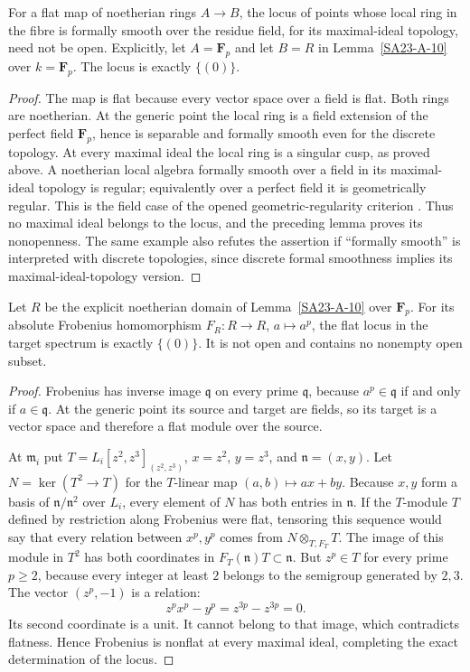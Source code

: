 \begin{theorem}\label{SA23-A-11}
For a flat map of noetherian rings $A\to B$, the locus of points
whose local ring in the fibre is formally smooth over the residue
field, for its maximal-ideal topology, need not be open.
Explicitly, let $A=\mathbf F_p$ and let $B=R$ in
Lemma~\ref{SA23-A-10} over $k=\mathbf F_p$.  The locus is exactly
$\{(0)\}$.
\end{theorem}
\begin{proof}
The map is flat because every vector space over a field is flat.
Both rings are noetherian.  At the generic point the local ring
is a field extension of the perfect field $\mathbf F_p$, hence
is separable and formally smooth even for the discrete topology.
At every maximal ideal the local ring is a singular cusp, as
proved above.  A noetherian local algebra formally smooth over a
field in its maximal-ideal topology is regular; equivalently over
a perfect field it is geometrically regular.  This is the
field case of the opened geometric-regularity criterion
\cite[Tag 07NQ, Proposition 15.41.5]{rootStacksRegular}.
Thus no maximal ideal belongs to the locus, and the preceding
lemma proves its nonopenness.  The same example also refutes the
assertion if ``formally smooth'' is interpreted with discrete
topologies, since discrete formal smoothness implies its
maximal-ideal-topology version.
\end{proof}

\begin{theorem}\label{SA23-A-12}
Let $R$ be the explicit noetherian domain of
Lemma~\ref{SA23-A-10} over $\mathbf F_p$.  For its absolute
Frobenius homomorphism
$F_R:R\to R$, $a\mapsto a^p$, the flat locus in the target
spectrum is exactly $\{(0)\}$.  It is not open and contains no
nonempty open subset.
\end{theorem}
\begin{proof}
Frobenius has inverse image $\mathfrak q$ on every prime
$\mathfrak q$, because $a^p\in\mathfrak q$ if and only if
$a\in\mathfrak q$.  At the generic point its source and target
are fields, so its target is a vector space and therefore a flat
module over the source.

At $\mathfrak m_i$ put
$T=L_i[z^2,z^3]_{(z^2,z^3)}$, $x=z^2$, $y=z^3$, and
$\mathfrak n=(x,y)$.  Let
$N=\ker(T^2\to T)$ for the $T$-linear map $(a,b)\mapsto ax+by$.
Because $x,y$ form a basis of $\mathfrak n/\mathfrak n^2$ over
$L_i$, every element of $N$ has both entries in $\mathfrak n$.
If the $T$-module $T$ defined by restriction along Frobenius were
flat, tensoring this sequence would say that every relation
between $x^p,y^p$ comes from $N\otimes_{T,F_T}T$.
The image of this module in $T^2$ has both coordinates in
$F_T(\mathfrak n)T\subset\mathfrak n$.
But $z^p\in T$ for every prime $p\geq2$, because every integer
at least $2$ belongs to the semigroup generated by $2,3$.
The vector $(z^p,-1)$ is a relation:
\[
 z^p x^p-y^p=z^{3p}-z^{3p}=0.
\]
Its second coordinate is a unit.  It cannot belong to that image,
which contradicts flatness.  Hence Frobenius is nonflat at every
maximal ideal, completing the exact determination of the locus.
\end{proof}

